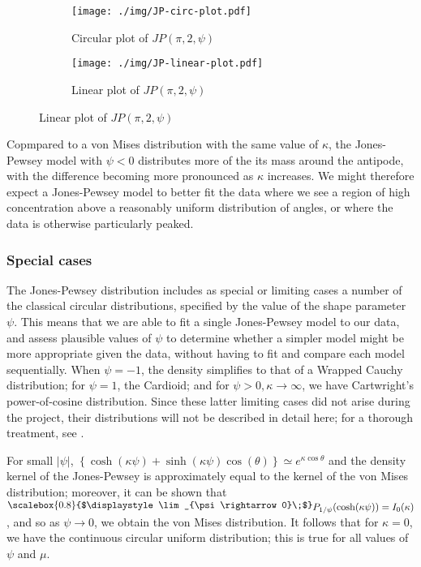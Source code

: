 \documentclass[../../ArchStats.tex]{subfiles}
\newcommand{\Lim}[1]{\raisebox{0.5ex}{\scalebox{0.8}{$\displaystyle \lim_{#1}\;$}}}
\begin{document}
\begin{figure}[!h]
\centering
\caption{Jones-Pewsey densities with $\mu = \pi$, $\kappa = 2$, and varying $\psi$}
\label{fig:JP-densities}
%
\begin{subfigure}[t]{0.4\textwidth}
\centering
\caption{Circular plot of $JP(\pi, 2, \psi)$}
\texttt{[image: ./img/JP-circ-plot.pdf]}
\end{subfigure}
%
\begin{subfigure}[t]{0.4\textwidth}
\centering
\caption{Linear plot of $JP(\pi, 2, \psi)$}
\texttt{[image: ./img/JP-linear-plot.pdf]}
\end{subfigure}
%
\end{figure}

Copmpared to a von Mises distribution with the same value of $\kappa$, the Jones-Pewsey model with $\psi < 0$ distributes more of the its mass around the antipode, with the difference becoming more pronounced as $\kappa$ increases. We might therefore expect a Jones-Pewsey model to better fit the data where we see a region of high concentration above a reasonably uniform distribution of angles, or where the data is otherwise particularly peaked.

\subsubsection{Special cases}

The Jones-Pewsey distribution includes as special or limiting cases a number of the classical circular distributions, specified by the value of the shape parameter $\psi$. This means that we are able to fit a single Jones-Pewsey model to our data, and assess plausible values of $\psi$ to determine whether a simpler model might be more appropriate given the data, without having to fit and compare each model sequentially. When $\psi = -1$, the density simplifies to that of a Wrapped Cauchy distribution; for $\psi = 1$, the Cardioid; and for $\psi > 0, \kappa \rightarrow \infty$, we have Cartwright's power-of-cosine distribution. Since these latter limiting cases did not arise during the project, their distributions will  not be described in detail here; for a thorough treatment, see \cite{Jones2005}. 

For small $\vert \psi \vert$, $\left\lbrace \cosh(\kappa\psi) + \sinh(\kappa\psi) \cos(\theta) \right\rbrace \simeq e^{\kappa \cos \theta}$ and the density kernel of the Jones-Pewsey is approximately equal to the kernel of the von Mises distribution; moreover, it can be shown that $\Lim{\psi \rightarrow 0} P_{1/\psi}(\cosh(\kappa\psi)) = I_0(\kappa)$, and so as $\psi \rightarrow 0$, we obtain the von Mises distribution. It follows that for $\kappa = 0$, we have the continuous circular uniform distribution; this is true for all values of $\psi$ and $\mu$.
\end{document}
